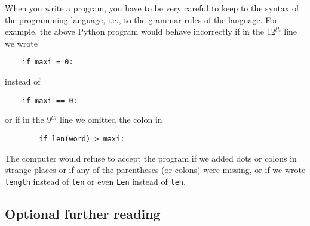 
\pagebreak

When you write a program, you have to be very careful to keep to the
syntax of the programming language, i.e., to the grammar rules of the language.
For example, the above Python program would
behave incorrectly if in the 12$^{th}$ line we wrote

\begin{Verbatim}
    if maxi = 0:
\end{Verbatim}

instead of 

\begin{Verbatim}
    if maxi == 0:
\end{Verbatim}

or if in the 9$^{th}$ line we omitted the colon in

\begin{Verbatim}
        if len(word) > maxi:
\end{Verbatim}

The computer would refuse to accept the program if we added dots or colons
in strange places
or if any of the parentheses (or colons) were missing, or if we wrote
\verb!length! instead of \verb!len! or even \verb!Len! instead of \verb!len!.

% 

\subsection{Optional further reading}



